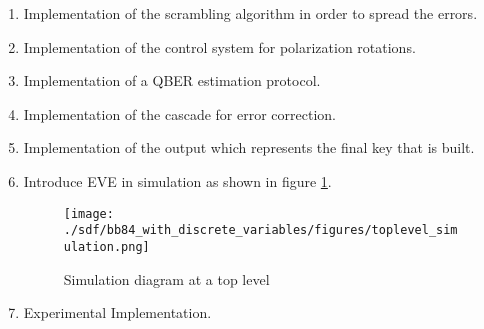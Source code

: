 \begin{refsection}
\begin{enumerate}
    \item Implementation of the scrambling algorithm in order to spread the errors.
    \item Implementation of the control system for polarization rotations.
    \item Implementation of a QBER estimation protocol.
    \item Implementation of the cascade for error correction.
    \item Implementation of the output which represents the final key that is built.
    \item Introduce EVE in simulation as shown in figure \ref{toplevelsimulation2}.
        \begin{figure}[H]
        	\centering
        	\texttt{[image: ./sdf/bb84\_with\_discrete\_variables/figures/toplevel\_simulation.png]}
        	\caption{Simulation diagram at a top level}\label{toplevelsimulation2}
        \end{figure}
    \item Experimental Implementation.
\end{enumerate}
  


\newpage


%
%	
%	
%	
%	

\clearpage
\printbibliography[heading=subbibliography]
\end{refsection}
\cleardoublepage

